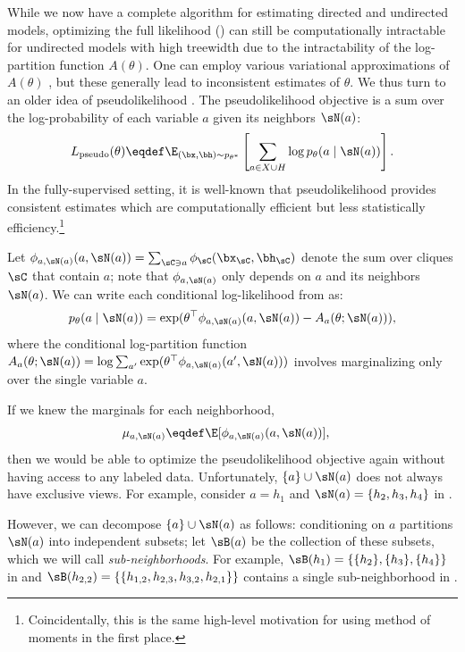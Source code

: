 While we now have a complete algorithm for estimating directed and undirected
models, optimizing the full likelihood ()
can still be computationally intractable for undirected models with high treewidth
due to the intractability of the log-partition function $A(\theta)$.
One can employ various variational approximations of $A(\theta)$ \cite{wainwright08varinf},
but these generally lead to inconsistent estimates of $\theta$.
We thus turn to an older idea of pseudolikelihood \citep{besag75pseudo}.
The pseudolikelihood objective is a sum over the log-probability of each
variable $a$ given its neighbors $\sN(a)$:
\begin{align}
  \label{eqn:pseudolikelihood}
  L_\text{pseudo}(\theta) \eqdef \E_{(\bx,\bh) \sim p_{\theta^*}}\left[\sum_{a \in X \cup H} \log p_\theta(a \mid \sN(a))\right].
\end{align}
In the fully-supervised setting, it is well-known that pseudolikelihood
provides consistent estimates which are computationally efficient
but less statistically efficiency.\footnote{
Coincidentally, this is the same high-level motivation for using method of
moments in the first place.}

Let $\phi_{a,\sN(a)}(a, \sN(a)) = \sum_{\sC \ni a} \phi_\sC(\bx_\sC,\bh_\sC)$
denote the sum over cliques $\sC$ that contain $a$; note that $\phi_{a, \sN(a)}$ only depends on $a$ and its neighbors $\sN(a)$.
We can write each conditional log-likelihood from  as:
\begin{align*}
p_\theta(a \mid \sN(a)) = \exp(\theta^\top\phi_{a,\sN(a)}(a, \sN(a)) - A_a(\theta; \sN(a))),
\end{align*}
where the conditional log-partition function $A_a(\theta; \sN(a)) = \log \sum_{a'} \exp(\theta^\top\phi_{a,\sN(a)}(a', \sN(a)))$
involves marginalizing only over the single variable $a$.

If we knew the marginals for each neighborhood,
\begin{align}
  \mu_{a,\sN(a)} &\eqdef \E[\phi_{a,\sN(a)}(a,\sN(a))], \label{eqn:neighborhoodFeatures}
\end{align}
then we would be able to optimize the pseudolikelihood objective again without
having access to any labeled data.
Unfortunately, $\{a\}\cup\sN(a)$ does not always have exclusive views.
For example, consider $a = h_1$ and $\sN(a) = \{h_2,h_3,h_4\}$ in .

However, we can decompose $\{a\}\cup\sN(a)$ as follows:
conditioning on $a$ partitions $\sN(a)$ into independent subsets;
let $\sB(a)$ be the collection of these subsets,
which we will call \emph{sub-neighborhoods}.
For example, $\sB(h_1) = \{ \{h_2\},\{h_3\},\{h_4\} \}$ in 
and $\sB(h_{2,2}) = \{ \{ h_{1,2}, h_{2,3}, h_{3,2}, h_{2,1} \} \}$ contains a single sub-neighborhood in .

